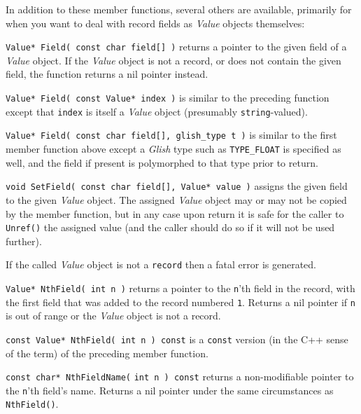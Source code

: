 In addition to these member functions, several others are available,
primarily for
when you want to deal with record fields as {\em Value} objects themselves:
\begin{sloppy}
\begin{list}{}{}

\item[{\tt Value* Field( const char field[] )}] returns a pointer
to the given field of a {\em Value} object.  If the {\em Value} object
is not a record, or does not contain the given field, the function
returns a nil pointer instead.

\item[{\tt Value* Field( const Value* index )}] is similar to the preceding
function except that {\tt index} is itself a {\em Value} object (presumably
{\tt string}-valued).

\item[{\tt Value* Field( const char field[], glish\_type t )}] is similar
to the first member function above except a {\em Glish} type such as {\tt TYPE\_FLOAT}
is specified as well, and the field if present is polymorphed to that type
prior to return.

\item[{\tt void SetField( const char field[], Value* value )}] assigns
the given field to the given {\em Value} object.  The assigned {\em Value}
object may or may not be copied by the member function, but in any case
upon return it is safe for the caller to {\tt Unref()} the assigned value
(and the caller should do so if it will not be used further).

If the called {\em Value} object is not a {\tt record} then a fatal
error is generated.

\item[{\tt Value* NthField( int n )}] returns
a pointer to the {\tt n}'th
field in the record, with the first field that was added to the record
numbered {\tt 1}.  Returns a nil pointer if {\tt n} is out of range or the
{\em Value} object is not a record.

\item[{\tt const Value* NthField( int n ) const}] is a {\tt const} version
(in the C++ sense of the term) of the preceding member function.

\item[{\tt const char* NthFieldName(}] {\tt int n ) const}
returns a non-modifiable
pointer to the {\tt n}'th field's name.  Returns a nil pointer under the
same circumstances as {\tt NthField()}.


\end{list}
\end{sloppy}
